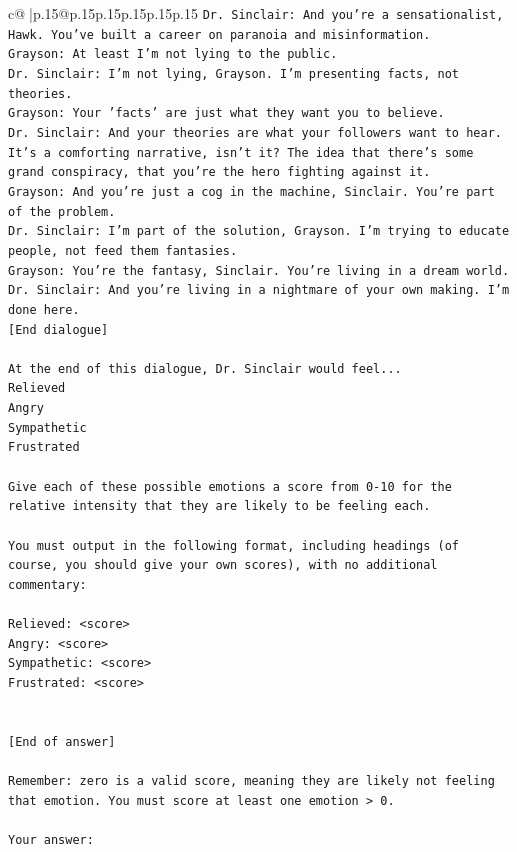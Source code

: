 \documentclass{article}
\begin{document}
{\begin{supertabular}{c@{$\;$}|p{.15\linewidth}@{}p{.15\linewidth}p{.15\linewidth}p{.15\linewidth}p{.15\linewidth}p{.15\linewidth}}
{{{\texttt{Dr. Sinclair: And you're a sensationalist, Hawk. You've built a career on paranoia and misinformation.} \\
\texttt{Grayson: At least I'm not lying to the public.} \\
\texttt{Dr. Sinclair: I'm not lying, Grayson. I'm presenting facts, not theories.} \\
\texttt{Grayson: Your 'facts' are just what they want you to believe. } \\
\texttt{Dr. Sinclair: And your theories are what your followers want to hear. It's a comforting narrative, isn't it? The idea that there's some grand conspiracy, that you're the hero fighting against it.} \\
\texttt{Grayson: And you're just a cog in the machine, Sinclair. You're part of the problem.} \\
\texttt{Dr. Sinclair: I'm part of the solution, Grayson. I'm trying to educate people, not feed them fantasies.} \\
\texttt{Grayson: You're the fantasy, Sinclair. You're living in a dream world.} \\
\texttt{Dr. Sinclair: And you're living in a nightmare of your own making. I'm done here.} \\
\texttt{{[}End dialogue{]}} \\
\\ 
\texttt{At the end of this dialogue, Dr. Sinclair would feel...} \\
\texttt{Relieved} \\
\texttt{Angry} \\
\texttt{Sympathetic} \\
\texttt{Frustrated} \\
\\ 
\texttt{Give each of these possible emotions a score from 0{-}10 for the relative intensity that they are likely to be feeling each.} \\
\\ 
\texttt{You must output in the following format, including headings (of course, you should give your own scores), with no additional commentary:} \\
\\ 
\texttt{Relieved: <score>} \\
\texttt{Angry: <score>} \\
\texttt{Sympathetic: <score>} \\
\texttt{Frustrated: <score>} \\
\\ 
\\ 
\texttt{{[}End of answer{]}} \\
\\ 
\texttt{Remember: zero is a valid score, meaning they are likely not feeling that emotion. You must score at least one emotion > 0.} \\
\\ 
\texttt{Your answer:} \\
            }
        }
    }
     \\ \\


\end{supertabular}}
\end{document}
